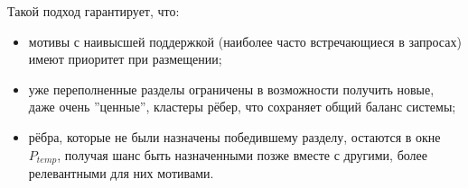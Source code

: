 Такой подход гарантирует, что:
\begin{itemize}
    \item мотивы с наивысшей поддержкой (наиболее часто встречающиеся в запросах) имеют приоритет при размещении;
    \item уже переполненные разделы ограничены в возможности получить новые, даже очень ''ценные'', кластеры рёбер, что сохраняет общий баланс системы;
    \item рёбра, которые не были назначены победившему разделу, остаются в окне $P_{temp}$, получая шанс быть назначенными позже вместе с другими, более релевантными для них мотивами.
\end{itemize}
